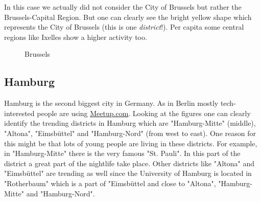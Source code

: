 In this case we actually did not consider the City of Brussels but rather the Brussels-Capital Region. But one can clearly see the bright yellow shape which represents the City of Brussels (this is one \emph{district}!). Per capita some central regions like Ixelles show a higher activity too. 
\begin{figure}[!htp]
	\hfill
	\caption{Brussels}\label{fig:madridmap}
\end{figure}

\subsection*{Hamburg}
Hamburg is the second biggest city in Germany. As in Berlin mostly tech-interested people are using \url{Meetup.com}. Looking at the figures one can clearly identify the trending districts in Hamburg which are "Hamburg-Mitte" (middle), "Altona", "Eimsbüttel" and "Hamburg-Nord" (from west to east). One reason for this might be that lots of young people are living in these districts. For example, in "Hamburg-Mitte" there is the very famous "St. Pauli". In this part of the district a great part of the nightlife take place. Other districts like "Altona" and "Eimsbüttel" are trending as well since the University of Hamburg is located in "Rotherbaum" which is a part of "Eimsbüttel and close to "Altona", "Hamburg-Mitte" and "Hamburg-Nord".

